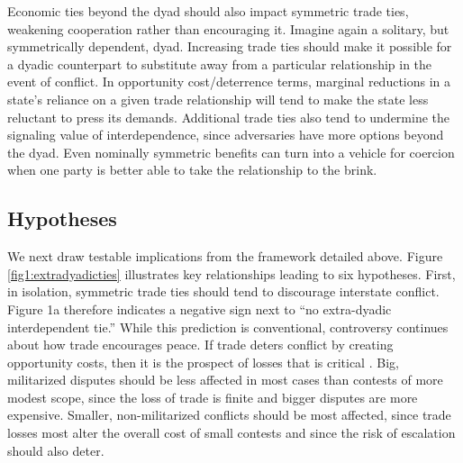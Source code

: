 \documentclass[12pt]{article}
\theoremstyle{hypothesis}
\begin{document}
Economic ties beyond the dyad should also impact symmetric trade ties, weakening cooperation rather than encouraging it. Imagine again a solitary, but symmetrically dependent, dyad. Increasing trade ties should make it possible for a dyadic counterpart to substitute away from a particular relationship in the event of conflict. In opportunity cost/deterrence terms, marginal reductions in a state's reliance on a given trade relationship will tend to make the state less reluctant to press its demands. Additional trade ties also tend to undermine the signaling value of interdependence, since adversaries have more options beyond the dyad. Even nominally symmetric benefits can turn into a vehicle for coercion when one party is better able to take the relationship to the brink.

\subsection*{Hypotheses}

We next draw testable implications from the framework detailed above.  Figure \ref{fig1:extradyadicties} illustrates key relationships leading to six hypotheses.  First, in isolation, symmetric trade ties should tend to discourage interstate conflict.  Figure 1a therefore indicates a negative sign next to ``no extra-dyadic interdependent tie.''  While this prediction is conventional, controversy continues about how trade encourages peace.  If trade deters conflict by creating opportunity costs, then it is the prospect of losses that is critical \citep{Polachek:2010}.  Big, militarized disputes should be less affected in most cases than contests of more modest scope, since the loss of trade is finite and bigger disputes are more expensive.  Smaller, non-militarized conflicts should be most affected, since trade losses most alter the overall cost of small contests and since the risk of escalation should also deter.
\end{document}
